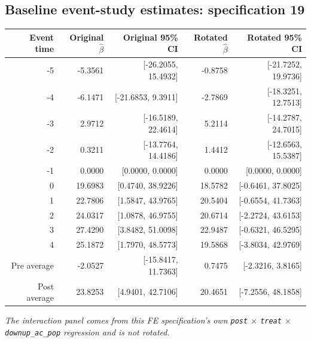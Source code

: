 \documentclass[10pt]{article}
\begin{document}
\subsection*{Baseline event-study estimates: specification 19}
\begin{center}
\scriptsize
\begin{tabular}{r rr rr}
\toprule
Event time & Original $\hat\beta$ & Original 95\% CI & Rotated $\hat\beta$ & Rotated 95\% CI \\
\midrule
-5 & -5.3561 & [-26.2055, 15.4932] & -0.8758 & [-21.7252, 19.9736] \\
-4 & -6.1471 & [-21.6853, 9.3911] & -2.7869 & [-18.3251, 12.7513] \\
-3 & 2.9712 & [-16.5189, 22.4614] & 5.2114 & [-14.2787, 24.7015] \\
-2 & 0.3211 & [-13.7764, 14.4186] & 1.4412 & [-12.6563, 15.5387] \\
-1 & 0.0000 & [0.0000, 0.0000] & 0.0000 & [0.0000, 0.0000] \\
0 & 19.6983 & [0.4740, 38.9226] & 18.5782 & [-0.6461, 37.8025] \\
1 & 22.7806 & [1.5847, 43.9765] & 20.5404 & [-0.6554, 41.7363] \\
2 & 24.0317 & [1.0878, 46.9755] & 20.6714 & [-2.2724, 43.6153] \\
3 & 27.4290 & [3.8482, 51.0098] & 22.9487 & [-0.6321, 46.5295] \\
4 & 25.1872 & [1.7970, 48.5773] & 19.5868 & [-3.8034, 42.9769] \\
\midrule
Pre average & -2.0527 & [-15.8417, 11.7363] & 0.7475 & [-2.3216, 3.8165] \\
Post average & 23.8253 & [4.9401, 42.7106] & 20.4651 & [-7.2556, 48.1858] \\
\bottomrule
\end{tabular}
\end{center}
\medskip
\textit{The interaction panel comes from this FE specification's own \texttt{post} $\times$ \texttt{treat} $\times$ \texttt{downup\_ac\_pop} regression and is not rotated.}
\clearpage
\end{document}
